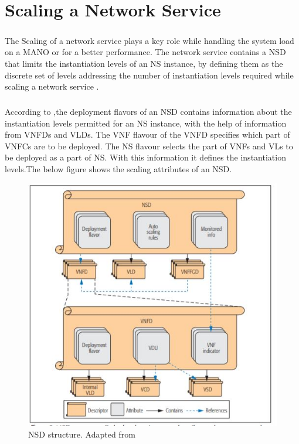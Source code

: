 \chapter{Scaling a Network Service}
\label{ch:Scaling a Network Service}

\paragraph{}The Scaling of a network service plays a key role while handling the system load on a MANO or for a better performance. The network service contains a NSD that limits the instantiation levels of an NS instance, by defining them as the discrete set of levels addressing the number of instantiation levels required while scaling a network service \cite{adamuz2018automated}.

\paragraph{}According to \cite{adamuz2018automated},the deployment flavors of an NSD contains information about the instantiation levels permitted for an NS instance, with the help of information from VNFDs and VLDs. The VNF flavour of the VNFD specifies which part of VNFCs are to be deployed. The NS flavour selects the part of VNFs and VLs to be deployed as a part of NS. With this information it defines the instantiation levels.The below figure shows the scaling attributes of an NSD.

\begin{figure} [H]
	\centering
	\includegraphics[width=0.6\linewidth]{"figures/NSD structure"}
	\caption{NSD structure. Adapted from \cite{adamuz2018automated}}
	\label{fig:nsd-structure}
\end{figure}




